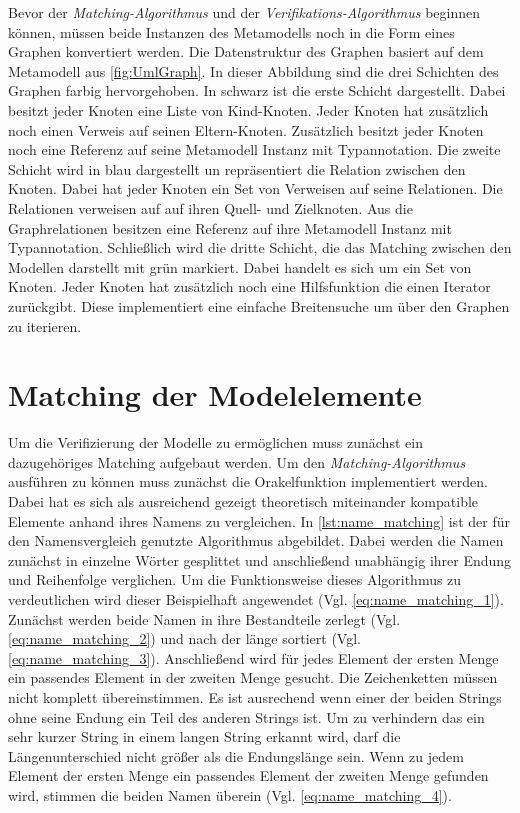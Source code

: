 Bevor der \emph{Matching-Algorithmus} und der \emph{Verifikations-Algorithmus} beginnen können, müssen beide Instanzen des Metamodells noch in die Form eines Graphen konvertiert werden.
Die Datenstruktur des Graphen basiert auf dem Metamodell aus \cref{fig:UmlGraph}.
In dieser Abbildung sind die drei Schichten des Graphen farbig hervorgehoben.
In schwarz ist die erste Schicht dargestellt.
Dabei besitzt jeder Knoten eine Liste von Kind-Knoten.
Jeder Knoten hat zusätzlich noch einen Verweis auf seinen Eltern-Knoten.
Zusätzlich besitzt jeder Knoten noch eine Referenz auf seine Metamodell Instanz mit Typannotation.
Die zweite Schicht wird in blau dargestellt un repräsentiert die Relation zwischen den Knoten.
Dabei hat jeder Knoten ein Set von Verweisen auf seine Relationen.
Die Relationen verweisen auf auf ihren Quell- und Zielknoten.
Aus die Graphrelationen besitzen eine Referenz auf ihre Metamodell Instanz mit Typannotation.
Schließlich wird die dritte Schicht, die das Matching zwischen den Modellen darstellt mit grün markiert.
Dabei handelt es sich um ein Set von Knoten.
Jeder Knoten hat zusätzlich noch eine Hilfsfunktion die einen Iterator zurückgibt.
Diese implementiert eine einfache Breitensuche um über den Graphen zu iterieren.

\section{Matching der Modelelemente}

Um die Verifizierung der Modelle zu ermöglichen muss zunächst ein dazugehöriges Matching aufgebaut werden.
Um den \emph{Matching-Algorithmus} ausführen zu können muss zunächst die Orakelfunktion implementiert werden.
Dabei hat es sich als ausreichend gezeigt theoretisch miteinander kompatible Elemente anhand ihres Namens zu vergleichen.
In \cref{lst:name_matching} ist der für den Namensvergleich genutzte Algorithmus abgebildet.
Dabei werden die Namen zunächst in einzelne Wörter gesplittet und anschließend unabhängig ihrer Endung und Reihenfolge verglichen.
Um die Funktionsweise dieses Algorithmus zu verdeutlichen wird dieser Beispielhaft angewendet (Vgl. \cref{eq:name_matching_1}).
Zunächst werden beide Namen in ihre Bestandteile zerlegt (Vgl. \cref{eq:name_matching_2}) und nach der länge sortiert (Vgl. \cref{eq:name_matching_3}).
Anschließend wird für jedes Element der ersten Menge ein passendes Element in der zweiten Menge gesucht.
Die Zeichenketten müssen nicht komplett übereinstimmen.
Es ist ausrechend wenn einer der beiden Strings ohne seine Endung ein Teil des anderen Strings ist.
Um zu verhindern das ein sehr kurzer String in einem langen String erkannt wird, darf die Längenunterschied nicht größer als die Endungslänge sein.
Wenn zu jedem Element der ersten Menge ein passendes Element der zweiten Menge gefunden wird, stimmen die beiden Namen überein (Vgl. \cref{eq:name_matching_4}).

